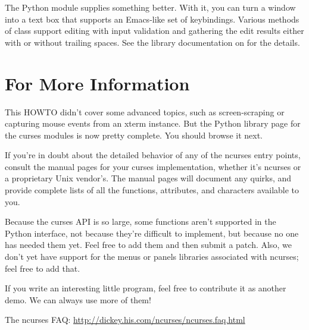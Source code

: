 \documentclass{howto}
\begin{document}
The Python  module supplies something better.
With it, you can turn a window into a text box that supports an
Emacs-like set of keybindings.  Various methods of 
class support editing with input validation and gathering the edit
results either with or without trailing spaces.   See the library
documentation on  for the details.

\section{For More Information}

This HOWTO didn't cover some advanced topics, such as screen-scraping
or capturing mouse events from an xterm instance.  But the Python
library page for the curses modules is now pretty complete.  You
should browse it next.

If you're in doubt about the detailed behavior of any of the ncurses
entry points, consult the manual pages for your curses implementation,
whether it's ncurses or a proprietary Unix vendor's.  The manual pages
will document any quirks, and provide complete lists of all the
functions, attributes, and  characters available to
you.

Because the curses API is so large, some functions aren't supported in
the Python interface, not because they're difficult to implement, but
because no one has needed them yet.  Feel free to add them and then
submit a patch.  Also, we don't yet have support for the menus or
panels libraries associated with ncurses; feel free to add that.

If you write an interesting little program, feel free to contribute it
as another demo.  We can always use more of them!

The ncurses FAQ: \url{http://dickey.his.com/ncurses/ncurses.faq.html}
\end{document}
